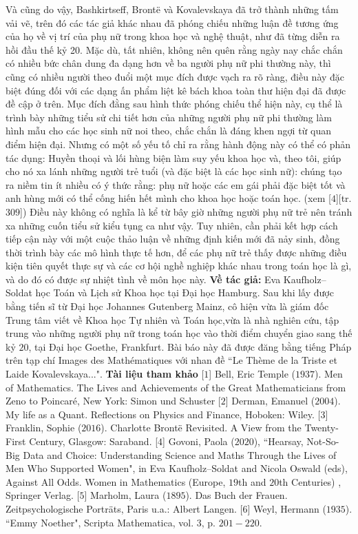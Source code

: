 \begin{multicols}{2}
	\vskip 0.1cm
	Và cũng do vậy, Bashkirtseff, Brontë và Kovalevskaya đã trở thành những tấm vải vẽ, trên đó các tác giả khác nhau đã phóng chiếu  những luận đề tương ứng của họ về vị trí của phụ nữ trong khoa học và nghệ thuật, như đã từng diễn ra hồi đầu thế kỷ 20. Mặc dù, tất nhiên, không nên quên rằng ngày nay chắc chắn có nhiều bức chân dung đa dạng hơn về ba người phụ nữ phi thường này, thì cũng có nhiều người theo đuổi một mục đích được vạch ra rõ ràng, điều này đặc biệt đúng đối với các dạng ấn phẩm liệt kê bách khoa toàn thư hiện đại đã được đề cập ở trên. Mục đích đằng sau hình thức phóng chiếu thể hiện này, cụ thể là trình bày những tiểu sử chi tiết hơn của những người phụ nữ phi thường  làm hình mẫu cho các học sinh nữ noi theo, chắc chắn là đáng khen ngợi từ quan điểm hiện đại. Nhưng có một số yếu tố chỉ ra rằng hành động này có thể có phản tác dụng:
	\vskip 0.1cm
	Huyền thoại và lối hùng biện làm suy yếu khoa học và, theo tôi, giúp cho nó xa lánh những người trẻ tuổi (và đặc biệt là các học sinh nữ): chúng tạo ra niềm tin ít nhiều có ý thức rằng: phụ nữ hoặc các em gái phải đặc biệt tốt và anh hùng mới có thể cống hiến hết mình cho khoa học hoặc toán học. (xem [$4$][tr. $309$])
	\vskip 0.1cm
	Điều này không có nghĩa là kể từ bây giờ những người phụ nữ trẻ nên tránh xa những cuốn tiểu sử kiểu tụng ca như vậy. Tuy nhiên, cần phải kết hợp cách tiếp cận này với một cuộc thảo luận về những định kiến mới đã nảy sinh, đồng thời trình bày các mô hình thực tế hơn, để các phụ nữ trẻ thấy được những điều kiện tiên quyết thực sự và các cơ hội nghề nghiệp khác nhau trong toán học là gì, và do đó có được sự nhiệt tình về môn học này.
	\vskip 0.1cm
	\textbf{\color{lichsutoanhoc}Về tác giả:} Eva Kaufholz--Soldat học Toán và Lịch sử Khoa học tại Đại học Hamburg. Sau khi lấy được bằng tiến sĩ từ Đại học Johannes Gutenberg Mainz, cô hiện vừa là giám đốc Trung tâm viết về Khoa học Tự nhiên và Toán học,vừa là nhà nghiên cứu, tập trung vào những người phụ nữ trong toán học vào thời điểm chuyển giao sang thế kỷ $20$, tại Đại học Goethe, Frankfurt. Bài báo này đã được đăng bằng tiếng Pháp trên tạp chí Images des Mathématiques với nhan đề ``Le Thème de la Triste et Laide Kovalevskaya...".
	\vskip 0.1cm
	\textbf{\color{lichsutoanhoc}Tài liệu tham khảo}
	\vskip 0.1cm
	[$1$] Bell, Eric Temple ($1937$). Men of Mathematics. The Lives and Achievements of the Great Mathematicians from Zeno to Poincaré, New York: Simon und Schuster
	\vskip 0.1cm
	[$2$] Derman, Emanuel ($2004$). My life as a Quant. Reflections on Physics and Finance, Hoboken: Wiley.
	\vskip 0.1cm
	[$3$] Franklin, Sophie ($2016$). Charlotte Brontë Revisited. A View from the Twenty-First Century, Glasgow: Saraband.
	\vskip 0.1cm
	[$4$] Govoni, Paola ($2020$), ``Hearsay, Not-So-Big Data and Choice: Understanding Science and Maths Through the Lives of Men Who Supported Women", in Eva Kaufholz--Soldat and Nicola Oswald (eds), Against All Odds. Women in Mathematics (Europe, $19$th and $20$th Centuries) , Springer Verlag.
	\vskip 0.1cm
	[$5$] Marholm, Laura ($1895$). Das Buch der Frauen. Zeitpsychologische Porträts, Paris u.a.: Albert Langen.
	\vskip 0.1cm
	[$6$] Weyl, Hermann ($1935$). ``Emmy Noether", Scripta Mathematica, vol. $3$, p. $201-220$.
\end{multicols}